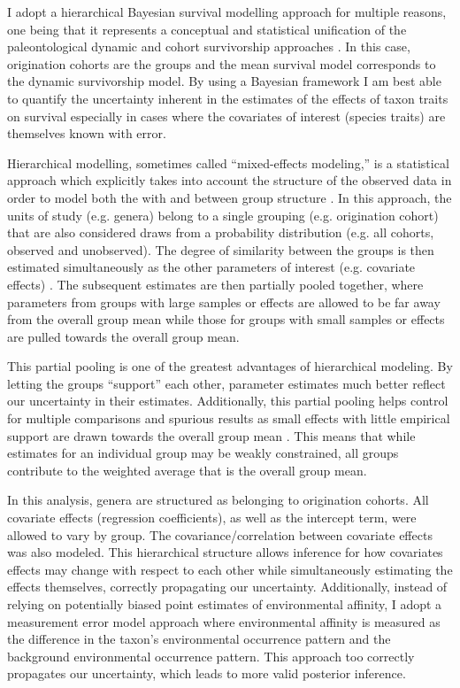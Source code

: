 \documentclass[12pt,letterpaper]{article}
\begin{document}
I adopt a hierarchical Bayesian survival modelling approach for multiple reasons, one being that it represents a conceptual and statistical unification of the paleontological dynamic and cohort survivorship approaches \citep{VanValen1973,VanValen1979,Raup1978,Raup1975,Foote1988,Baumiller1993,Simpson2006}. In this case, origination cohorts are the groups and the mean survival model corresponds to the dynamic survivorship model. By using a Bayesian framework I am best able to quantify the uncertainty inherent in the estimates of the effects of taxon traits on survival especially in cases where the covariates of interest (species traits) are themselves known with error.

Hierarchical modelling, sometimes called ``mixed-effects modeling,'' is a statistical approach which explicitly takes into account the structure of the observed data in order to model both the with and between group structure \citep{Gelman2013d,Gelman2007}. In this approach, the units of study (e.g. genera) belong to a single grouping (e.g. origination cohort) that are also considered draws from a probability distribution (e.g. all cohorts, observed and unobserved). The degree of similarity between the groups is then estimated simultaneously as the other parameters of interest (e.g. covariate effects) \citep{Gelman2013d}. The subsequent estimates are then partially pooled together, where parameters from groups with large samples or effects are allowed to be far away from the overall group mean while those for groups with small samples or effects are pulled towards the overall group mean.

This partial pooling is one of the greatest advantages of hierarchical modeling. By letting the groups ``support'' each other, parameter estimates much better reflect our uncertainty in their estimates. Additionally, this partial pooling helps control for multiple comparisons and spurious results as small effects with little empirical support are drawn towards the overall group mean \citep{Gelman2013d,Gelman2007}. This means that while estimates for an individual group may be weakly constrained, all groups contribute to the weighted average that is the overall group mean.

In this analysis, genera are structured as belonging to origination cohorts. All covariate effects (regression coefficients), as well as the intercept term, were allowed to vary by group. The covariance/correlation between covariate effects was also modeled. This hierarchical structure allows inference for how covariates effects may change with respect to each other while simultaneously estimating the effects themselves, correctly propagating our uncertainty. Additionally, instead of relying on potentially biased point estimates of environmental affinity, I adopt a measurement error model approach where environmental affinity is measured as the difference in the taxon's environmental occurrence pattern and the background environmental occurrence pattern. This approach too correctly propagates our uncertainty, which leads to more valid posterior inference.
\end{document}
